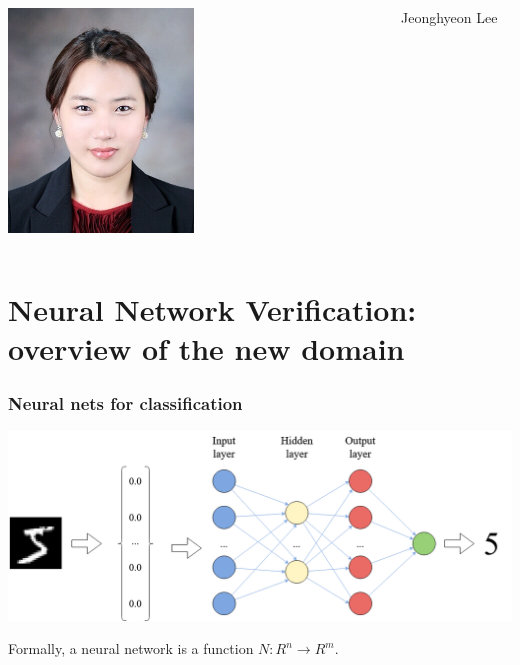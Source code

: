 \documentclass[t,compress,aspectratio=169]{beamer}
\begin{document}
\begin{frame}
\begin{columns}
   \centering
  \includegraphics[width=0.5\textwidth]{img/JL.jpeg}
\begin{block}{\centering\footnotesize{Jeonghyeon Lee}}
   \end{block}
  \end{columns}
  \end{frame}




\section{Neural Network Verification: overview of the new domain}


\begin{frame}
\frametitle{Neural nets for classification}
\centering\includegraphics[scale=.30]{img/mnist_classification.png}

\begin{block}{Formally,}
 a neural network is a function $N : R^n \rightarrow R^m$.
\end{block}

\end{frame}
\end{document}
